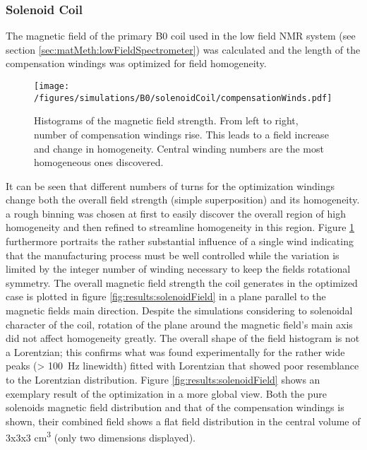             \subsubsection{Solenoid Coil}
            \label{sec:results:B0solenoid}
            The magnetic field of the primary B0 coil used in the low field NMR system (see section \ref{sec:matMeth:lowFieldSpectrometer}) was calculated and the length of the compensation windings was optimized for field homogeneity.
                \begin{figure}
                    \centering
                    \texttt{[image: /figures/simulations/B0/solenoidCoil/compensationWinds.pdf]}
                    \caption[Compensation wind optimization]{Histograms of the magnetic field strength. From left to right, number of compensation windings rise. This leads to a field increase and change in homogeneity. Central winding numbers are the most homogeneous ones discovered.}
                    \label{fig:results:compensationWindOptimization}
                \end{figure}
            It can be seen that different numbers of turns for the optimization windings change both the overall field strength (simple superposition) and its homogeneity. a rough binning was chosen at first to easily discover the overall region of high homogeneity and then refined to streamline homogeneity in this region.
            Figure \ref{fig:results:compensationWindOptimization} furthermore portraits the rather substantial influence of a single wind indicating that the manufacturing process must be well controlled while the variation is limited by the integer number of winding necessary to keep the fields rotational symmetry.
            The  overall magnetic field strength the coil generates in the optimized case is plotted in figure \ref{fig:results:solenoidField} in a plane parallel to the magnetic fields main direction. Despite the simulations considering to solenoidal character of the coil, rotation of the plane around the magnetic field's main axis did not affect homogeneity greatly. The overall shape of the field histogram is not a Lorentzian; this confirms what was found experimentally for the rather wide peaks (> \SI{100}{\hertz} linewidth) fitted with Lorentzian that showed poor resemblance to the Lorentzian distribution. Figure \ref{fig:results:solenoidField} shows an exemplary result of the optimization in a more global view. Both the pure solenoids magnetic field distribution and that of the compensation windings is shown, their combined field shows a flat field distribution in the central volume of 3x3x3 \si{\cm\cubed} (only two dimensions displayed).
